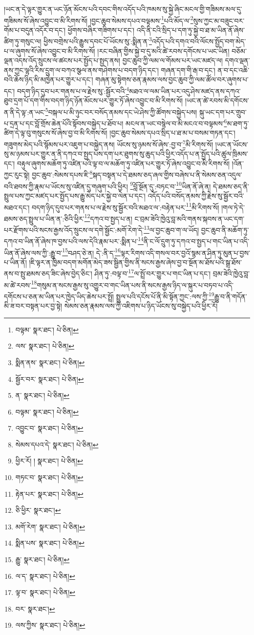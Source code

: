 །ཡང་ན་དེ་ལྟར་གྱུར་ན་ཡང་ཉོན་མོངས་པའི་དབང་གིས་འདོད་པའི་ཁམས་སུ་སྐྱེ་ཞིང་མངལ་གྱི་གཟིམས་མལ་དུ་གཟིམས་སོ་ཞེས་འབྱུང་བ་མི་རིགས་སོ། །བྱང་ཆུབ་སེམས་དཔའ་བལྟམས་\footnote{བལྟམ་  སྣར་ཐང་།  པེ་ཅིན། }པའི་མོད་ལ་\footnote{ལས་  སྣར་ཐང་།  པེ་ཅིན། }སུས་ཀྱང་མ་བཟུང་བར་གོམ་པ་བདུན་འདོར་བ་དང་། ཕྱོགས་བཞིར་གཟིགས་པ་དང་། འདི་ནི་ངའི་སྲིད་པ་དག་ཏུ་སྐྱེ་བ་ཐ་མ་ཡིན་ནོ་ཞེས་ཚིག་ཏུ་གསུང་ལ། ཕྱིས་བགྲེས་པའི་རྒྱུས་དབང་པོ་ཡོངས་སུ་:སྨིན་ན་\footnote{སྨིན་ནས་  སྣར་ཐང་།  པེ་ཅིན། }འདོད་པའི་དགའ་བའི་ལོངས་སྤྱོད་བག་མེད་པ་ལ་ཞུགས་སོ་ཞེས་འབྱུང་བ་མི་རིགས་སོ། །རང་བཞིན་གྱིས་སྐྱེ་བ་དུ་མའི་ཚེ་རབས་དགོངས་པ་ཡང་ཡིན། བཅོམ་ལྡན་འདས་འོད་སྲུངས་ལ་ཚངས་པར་སྤྱོད་པ་སྤྱད་ནས། བྱང་ཆུབ་ཀྱི་ལམ་ལ་གོམས་པར་ཡང་མཛད་ལ། དགའ་ལྡན་ནས་ཀྱང་ལྷའི་རིས་དྲུག་ལ་བཀའ་སྩལ་ནས་གཤེགས་པ་བདག་ཉིད་དང་། གཞན་དག་གི་རྒ་བ་དང་། ན་བ་དང་འཆི་བའི་ཆོས་ཉིད་མི་མཁྱེན་པར་གྱུར་པ་དང་། གཞན་མུ་སྟེགས་ཅན་རྣམས་ལས་བྱང་ཆུབ་ཀྱི་ལམ་ཚོལ་བར་ཞུགས་པ་དང་། བདག་ཉིད་དུབ་པར་གནས་པ་ལ་རྗེས་སུ་:སྦྱོར་བའི་\footnote{སྦྱོར་བར་  སྣར་ཐང་།  པེ་ཅིན། }མཐའ་ལ་ལམ་ཡིན་པར་འདུ་ཤེས་མཛད་ནས་དཀའ་ཐུབ་དྲག་པོ་དག་གིས་བདག་ཉིད་ཉོན་མོངས་པར་གྱུར་ཏོ་ཞེས་འབྱུང་བ་མི་རིགས་སོ། །ཡང་ན་ཚེ་རབས་མི་དགོངས་ན་ནི་དེ་ལྟ་:ན་ཡང་\footnote{ན་  སྣར་ཐང་།  པེ་ཅིན། }བསྐལ་པ་མི་ཉུང་བར་བསོད་ནམས་དང་ཡེ་ཤེས་ཀྱི་ཚོགས་བསྐྱེད་པས། སྐུ་ཡང་དག་པར་གྲུབ་པ་དྲན་པ་དང་བློ་གྲོས་ཆེན་པོའི་སྟོབས་བསྐྱེད་པ་ཐོབ་པ། མངལ་ན་ཡང་བསྙེལ་བ་མི་མངའ་བ་བལྟམས་\footnote{བལྟམ་  སྣར་ཐང་།  པེ་ཅིན། }མ་ཐག་ཏུ་ཚིག་དེ་ལྟ་བུ་གསུངས་སོ་ཞེས་བྱ་བ་མི་རིགས་སོ། །བྱང་ཆུབ་སེམས་དཔའ་སྲིད་པ་ཐ་མ་པ་བསམ་གཏན་དང་། གཟུགས་མེད་པའི་སྙོམས་པར་འཇུག་པ་བསྐྱེད་ནས། ཡོངས་སུ་ཉམས་སོ་ཞེས་:བྱ་བ་\footnote{འབྱུང་བ་  སྣར་ཐང་།  པེ་ཅིན། }མི་རིགས་སོ། །ཡང་ན་ཡོངས་སུ་མ་ཉམས་པར་གྱུར་ན་ནི་དཀའ་བ་སྤྱད་པས་དག་པར་ཐུགས་སུ་ཆུད་པའི་ཕྱིར་འདོད་པ་ན་སྤྱོད་པའི་ཚུལ་ཁྲིམས་དང་། བརྟུལ་ཞུགས་མཆོག་ཏུ་འཛིན་པའི་ལྟ་བ་ལ་མཆོག་ཏུ་འཛིན་པར་གྱུར་ཏོ་ཞེས་འབྱུང་བ་མི་རིགས་སོ། །འོན་ཀྱང་རུང་སྟེ། བྱང་ཆུབ་:སེམས་དཔས་ཇི་\footnote{སེམས་དཔའ་དེ་  སྣར་ཐང་།  པེ་ཅིན། }སྐད་བསྟན་པ་དེ་ཐམས་ཅད་ཞལ་གྱིས་བཞེས་པ་ནི་སེམས་ཅན་འདུལ་བའི་ཐབས་ཀྱི་རྣམ་པ་ཡོངས་སུ་འཛིན་དུ་གཞུག་པའི་ཕྱིར། \footnote{ཕྱིར་རོ། །   སྣར་ཐང་།  པེ་ཅིན། }བློ་སྔོན་དུ་:བཏང་བ་\footnote{གཏང་བ་  སྣར་ཐང་།  པེ་ཅིན། }ཡིན་ནོ་ཞེ་ན། དེ་ཐམས་ཅད་ནི་སྤྲུལ་པས་ཀྱང་མཛད་པར་སྤྱོད་པས་རྒྱུ་མེད་པར་སྐྱེ་བ་ལེན་པ་དང་། འདོད་པའི་བསོད་ནམས་ཀྱི་རྗེས་སུ་སྦྱོར་བའི་མཐའ་དང་། བདག་ཉིད་དུབ་པར་གནས་པ་ལ་རྗེས་སུ་སྦྱོར་བའི་མཐའ་ལ་:བརྟེན་པར་\footnote{རྟེན་པར་  སྣར་ཐང་།  པེ་ཅིན། }མི་རིགས་སོ། །གལ་ཏེ་དེ་ཐམས་ཅད་སྤྲུལ་པ་ཡིན་ན་:ཅིའི་ཕྱིར་\footnote{ཅི་ཕྱིར་  སྣར་ཐང་། }དཀའ་བ་སྤྱད་པ་ན། ང་བྲམ་ཟེའི་ཁྱེའུ་བླ་མའི་གནས་སྐབས་ན་ཡང་དག་པར་རྫོགས་པའི་སངས་རྒྱས་འོད་སྲུངས་ལ་དགེ་སྦྱོང་:མགོ་རེག་དེ་\footnote{མགོ་རེག་  སྣར་ཐང་།  པེ་ཅིན། }ལ་བྱང་ཆུབ་ག་ལ་ཡོད། བྱང་ཆུབ་ནི་མཆོག་ཏུ་དཀའ་བ་ཡིན་ནོ་ཞེས་ཁ་བྱས་པའི་ལས་དེའི་རྣམ་པར་:སྨིན་པ་\footnote{སྨིན་པས་  སྣར་ཐང་།  པེ་ཅིན། }ནི་ང་ལོ་དྲུག་ཏུ་དཀའ་བ་སྤྱད་པ་གང་ཡིན་པ་འདི་ཡིན་ནོ་ཞེས་ལས་ཀྱི་:རྒྱུ་བ་\footnote{རྒྱུ་  སྣར་ཐང་།  པེ་ཅིན། }བཤད་ཅེ་ན། དེ་:ནི་ད་\footnote{ལ་ད་  སྣར་ཐང་།  པེ་ཅིན། }ལྟར་རིགས་འདི་གསལ་བར་བྱའོ་སྙམ་ན་ཤིན་ཏུ་མུན་པ་བྱས་པ་ཡིན་ནོ། །ཇི་ལྟར་ན་ཁྱིམ་བདག་མགོན་མེད་ཟས་སྦྱིན་གྱིས་ནི་སངས་རྒྱས་ཞེས་བྱ་བ་སྔོན་མ་ཐོས་པའི་སྒྲ་ཐོས་ནས་བ་སྤུ་ཐམས་ཅད་ཟིང་ཞེས་བྱེད་ཅིང་། ཤིན་ཏུ་:བལྟ་བ་\footnote{ལྟ་བ་  སྣར་ཐང་།  པེ་ཅིན། }ལ་སྤྲོ་བར་གྱུར་པ་གང་ཡིན་པ་དང་། བྲམ་ཟེའི་ཁྱེའུ་བླ་མ་ཚེ་རབས་\footnote{བར་  སྣར་ཐང་། }གསུམ་ན་སངས་རྒྱས་སུ་འགྱུར་བ་གང་ཡིན་པས་ནི་སངས་རྒྱས་ཉིད་ལ་སྐུར་པ་བཏབ་པ་འདི་དགོངས་པ་ཅན་མ་ཡིན་པར་ཁྱེད་ཡིད་ཆེས་པར་སྤྲོ། སྤྲུལ་པའི་དངོས་པོ་ནི་མི་སྟོན་ཀྱང་:ལས་ཀྱི་\footnote{ལས་ཀྱིས་  སྣར་ཐང་།  པེ་ཅིན། }རྒྱུ་བ་ནི་གདོན་མི་ཟ་བར་བསྟན་པར་བྱ་སྟེ། སེམས་ཅན་རྣམས་ལས་ཀྱི་འཇིགས་པ་ཉིད་ཡོངས་སུ་བསྐྱེད་པའི་ཕྱིར་རོ། 